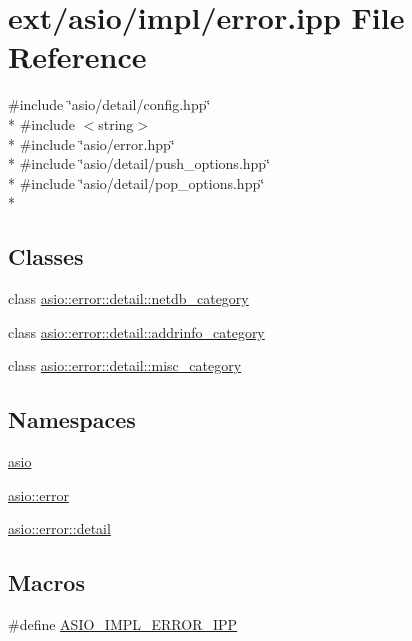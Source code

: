 \hypertarget{impl_2error_8ipp}{}\section{ext/asio/impl/error.ipp File Reference}
\label{impl_2error_8ipp}
{\ttfamily \#include \char`\"{}asio/detail/config.\+hpp\char`\"{}}\\*
{\ttfamily \#include $<$string$>$}\\*
{\ttfamily \#include \char`\"{}asio/error.\+hpp\char`\"{}}\\*
{\ttfamily \#include \char`\"{}asio/detail/push\+\_\+options.\+hpp\char`\"{}}\\*
{\ttfamily \#include \char`\"{}asio/detail/pop\+\_\+options.\+hpp\char`\"{}}\\*
\subsection*{Classes}
\begin{DoxyCompactItemize}
\item 
class \hyperlink{classasio_1_1error_1_1detail_1_1netdb__category}{asio\+::error\+::detail\+::netdb\+\_\+category}
\item 
class \hyperlink{classasio_1_1error_1_1detail_1_1addrinfo__category}{asio\+::error\+::detail\+::addrinfo\+\_\+category}
\item 
class \hyperlink{classasio_1_1error_1_1detail_1_1misc__category}{asio\+::error\+::detail\+::misc\+\_\+category}
\end{DoxyCompactItemize}
\subsection*{Namespaces}
\begin{DoxyCompactItemize}
\item 
 \hyperlink{namespaceasio}{asio}
\item 
 \hyperlink{namespaceasio_1_1error}{asio\+::error}
\item 
 \hyperlink{namespaceasio_1_1error_1_1detail}{asio\+::error\+::detail}
\end{DoxyCompactItemize}
\subsection*{Macros}
\begin{DoxyCompactItemize}
\item 
\#define \hyperlink{impl_2error_8ipp_a8d7ec220e0d9995e47546473c34052bf}{A\+S\+I\+O\+\_\+\+I\+M\+P\+L\+\_\+\+E\+R\+R\+O\+R\+\_\+\+I\+P\+P}
\end{DoxyCompactItemize}
